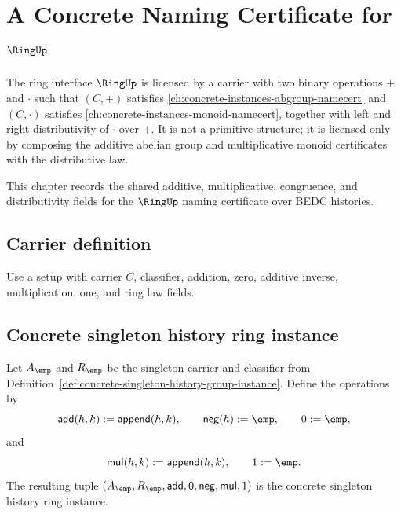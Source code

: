\chapter{A Concrete Naming Certificate for \(\RingUp\)}
\label{ch:concrete-instances-ring-namecert}

The ring interface \(\RingUp\) is licensed by a carrier with two binary operations \(+\) and \(\cdot\) such that \((C, +)\) satisfies \autoref{ch:concrete-instances-abgroup-namecert} and \((C, \cdot)\) satisfies \autoref{ch:concrete-instances-monoid-namecert}, together with left and right distributivity of \(\cdot\) over \(+\). It is not a primitive structure; it is licensed only by composing the additive abelian group and multiplicative monoid certificates with the distributive law.

\begin{remark}
\label{rem:concrete-instances-ring-namecert-roadmap}
This chapter records the shared additive, multiplicative, congruence, and distributivity fields for the \(\RingUp\) naming certificate over BEDC histories.
\end{remark}

\section{Carrier definition}

\begin{definition}
\label{def:ring-carrier}
Use a setup with carrier \(C\), classifier, addition, zero, additive inverse, multiplication, one, and ring law fields.
\end{definition}

\section{Concrete singleton history ring instance}
\label{sec:ring-concrete-singleton-history-instance}

\begin{definition}
\label{def:concrete-singleton-history-ring-instance}
Let $A_{\emp}$ and $R_{\emp}$ be the singleton carrier and classifier from
Definition~\ref{def:concrete-singleton-history-group-instance}. Define the
operations by
$$
\mathsf{add}(h,k):=\mathsf{append}(h,k),\qquad
\mathsf{neg}(h):=\emp,\qquad
0:=\emp,
$$
and
$$
\mathsf{mul}(h,k):=\mathsf{append}(h,k),\qquad
1:=\emp.
$$
The resulting tuple
$(A_{\emp},R_{\emp},\mathsf{add},0,\mathsf{neg},\mathsf{mul},1)$ is the
concrete singleton history ring instance.
\end{definition}

